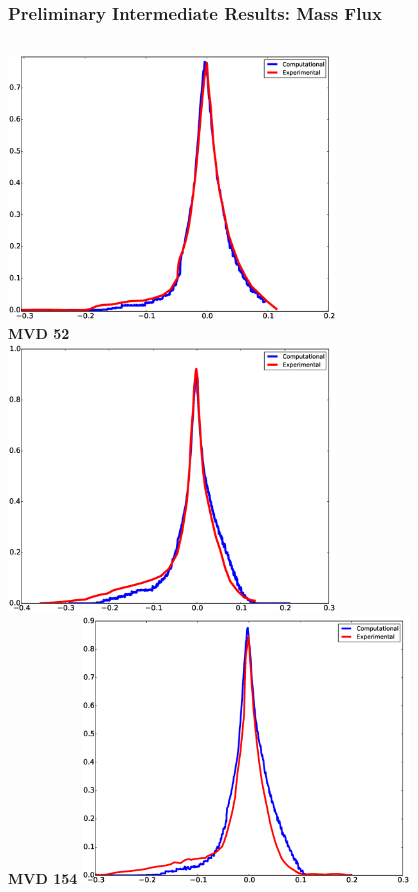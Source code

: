 \documentclass[9pt]{beamer}
\begin{document}
\begin{frame}
\frametitle{Preliminary Intermediate Results: Mass Flux}
\label{sec-5-6}


\begin{columns}[c]
    \centering
    \includegraphics[width=0.65\textwidth]{MVD52} \\
    {\bf MVD 52} \\
    \includegraphics[width=0.65\textwidth]{MVD154} \\
    {\bf MVD 154}
    \centering
    \includegraphics[width=0.65\textwidth]{MVD111} \\

\end{columns}
\end{frame}
\end{document}
